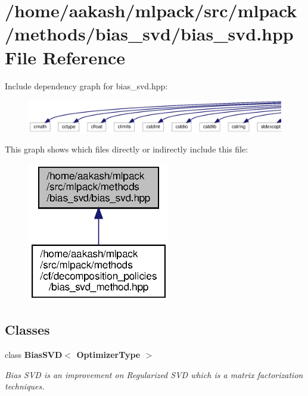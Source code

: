 \section{/home/aakash/mlpack/src/mlpack/methods/bias\+\_\+svd/bias\+\_\+svd.hpp File Reference}
\label{bias__svd_8hpp}
Include dependency graph for bias\+\_\+svd.\+hpp\+:
\nopagebreak
\begin{figure}[H]
\begin{center}
\leavevmode
\includegraphics[width=350pt]{bias__svd_8hpp__incl}
\end{center}
\end{figure}
This graph shows which files directly or indirectly include this file\+:
\nopagebreak
\begin{figure}[H]
\begin{center}
\leavevmode
\includegraphics[width=176pt]{bias__svd_8hpp__dep__incl}
\end{center}
\end{figure}
\subsection*{Classes}
\begin{DoxyCompactItemize}
\item 
class \textbf{ Bias\+S\+V\+D$<$ Optimizer\+Type $>$}
\begin{DoxyCompactList}\small\item\em Bias S\+VD is an improvement on Regularized S\+VD which is a matrix factorization techniques. \end{DoxyCompactList}\end{DoxyCompactItemize}
